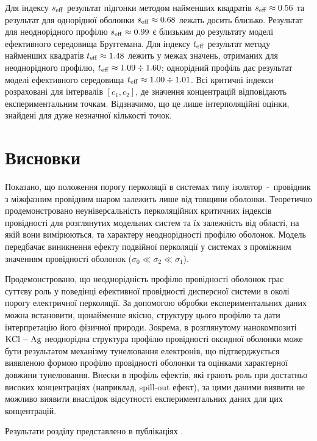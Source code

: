 \documentclass[14pt,twoside]{vakthesis}
\begin{document}
Для індексу $s_{\rm eff}$ результат підгонки методом найменших квадратів $s_{\rm eff}\approx 0.56$ та результат для однорідної оболонки $s_{\rm eff} \approx 0.68$ лежать досить близько. Результат для неоднорідного профілю $s_{\rm eff} \approx 0.99$ є близьким до результату моделі ефективного середовища Бруггемана. Для індексу $t_{\rm eff}$ результат методу найменших квадратів $t_{\rm eff} \approx 1.48$ лежить у межах значень, отриманих для неоднорідного профілю, $t_{\rm eff} \approx 1.09 \div 1.60$; однорідний профіль дає результат моделі ефективного середовища $t_{\rm eff} \approx 1.00 \div 1.01$. Всі критичні індекси розраховані для інтервалів $[c_1, c_2]$, де значення концентрацій відповідають експериментальним точкам. Відзначимо, що це лише інтерполяційні оцінки, знайдені для дуже незначної кількості точок.


\section{Висновки}

Показано, що положення порогу перколяції в системах типу ізолятор~-~провідник з міжфазним провідним шаром залежить лише від товщини оболонки.
Теоретично продемонстровано неуніверсальність перколяційних критичних індексів провідності для розглянутих модельних систем \cite{Balberg1987, Myroshnychenko2008} та їх залежність від області, на якій вони вимірюються, та характеру неоднорідності профілю оболонок. Модель передбачає виникнення ефекту подвійної перколяції у системах з проміжним значенням провідності оболонок ($\sigma_0 \ll \sigma_2 \ll \sigma_1$).

Продемонстровано, що неоднорідність профілю провідності оболонок грає суттєву роль у поведінці ефективної провідності дисперсної системи в околі порогу електричної перколяції. За допомогою обробки експериментальних даних можна встановити, щонайменше якісно, структуру цього профілю та дати інтерпретацію його фізичної природи.
Зокрема, в розглянутому нанокомпозиті $\rm KCl-Ag$ неоднорідна структура профілю провідності оксидної оболонки може бути результатом механізму тунелювання електронів, що підтверджується виявленою формою профілю провідності оболонки та оцінками характерної довжини тунелювання. Внески в профіль ефектів, які грають роль при достатньо високих концентраціях (наприклад, spill-out ефект), за цими даними виявити не можливо виявити внаслідок відсутності експериментальних даних для цих концентрацій.

Результати розділу представлено в публікаціях \cite{Sushko2013,Semenov2020}.
\end{document}

